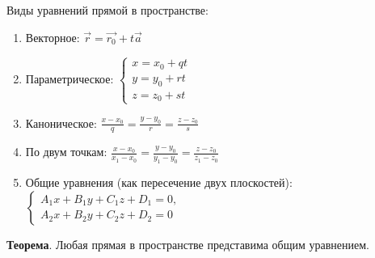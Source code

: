 \documentclass[a4paper]{article}
\begin{document}
Виды уравнений прямой в пространстве:
\begin{enumerate}
\item Векторное: $\vec{r} = \vec{r_0} + t\vec{a}$
\item Параметрическое: $\begin{cases}
   x=x_0+qt
   \\
   y=y_0+rt
   \\
   z=z_0+st
 \end{cases}$
\item Каноническое: $\displaystyle \frac{x-x_0}{q} = \frac{y-y_0}{r} = \frac{z-z_0}{s}$
\item По двум точкам: $\displaystyle \frac{x-x_0}{x_1-x_0} = \frac{y-y_0}{y_1-y_0} = \frac{z-z_0}{z_1-z_0}$
\item Общие уравнения (как пересечение двух плоскостей): $\begin{cases}
A_1x+B_1y+C_1z+D_1=0,
\\
A_2x+B_2y+C_2z+D_2=0
\end{cases}$
\end{enumerate}

\begin{htheorem}
\textbf{Теорема}. Любая прямая в пространстве представима общим уравнением.
\end{htheorem}
\end{document}
